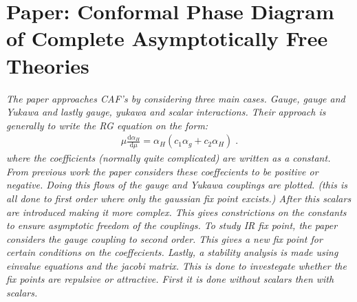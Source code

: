 \section{Paper: Conformal Phase Diagram of Complete Asymptotically Free Theories}

\textit{The paper approaches CAF's by considering three main cases. Gauge, gauge and Yukawa and lastly gauge, yukawa and scalar interactions. Their approach is generally to write the RG equation on the form:
\begin{align}
    \mu \frac{\mathrm{d} \alpha_H}{\mathrm{d} \mu}=\alpha_H (c_1\alpha_g+c_2 \alpha_H)\;.
\end{align}
where the coefficients (normally quite complicated) are written as a constant. From previous work the paper considers these coeffecients to be positive or negative. Doing this flows of the gauge and Yukawa couplings are plotted. (this is all done to first order where only the gaussian fix point excists.) After this scalars are introduced making it more complex. This gives constrictions on the constants to ensure asymptotic freedom of the couplings. To study IR fix point, the paper considers the gauge coupling to second order. This gives a new fix point for certain conditions on the coeffecients. Lastly, a stability analysis is made using einvalue equations and the jacobi matrix. This is done to investegate whether the fix points are repulsive or attractive. First it is done without scalars then with scalars.}\\


